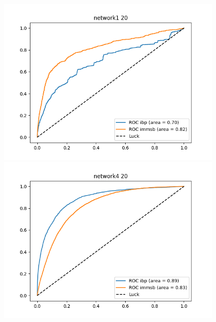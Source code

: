 \begin{figure}[h]
    \centering
        \begin{minipage}{0.24\textwidth}
            \includegraphics[width=\textwidth]{img/corpus/roc_network1_20}
        \end{minipage}
        \begin{minipage}{0.24\textwidth}
            \includegraphics[width=\textwidth]{img/corpus/roc_network4_20}
        \end{minipage}
        \begin{minipage}{0.4\textwidth}

\end{minipage}
\end{figure}
